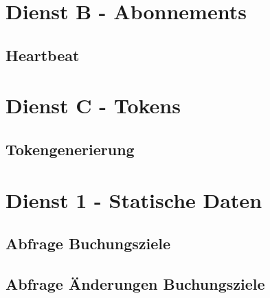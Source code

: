 \section{Dienst B - Abonnements}
\label{sec:Nachrichten:DienstB}

\subsection*{Heartbeat}
\label{subsec:Nachrichten:DienstB:HeartBeat}





\section{Dienst C - Tokens}
\label{sec:Nachrichten:DienstC}

\subsection*{Tokengenerierung}
\label{subsec:Nachrichten:DienstC:Tokengenerierung}





\section{Dienst 1 - Statische Daten}
\label{sec:Nachrichten:Dienst1}

\subsection*{Abfrage Buchungsziele}
\label{subsec:Nachrichten:Dienst1:BookingTargets}





\subsection*{Abfrage Änderungen Buchungsziele}
\label{subsec:Nachrichten:Dienst1:ChangeProviders}





